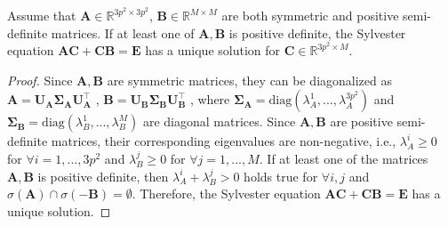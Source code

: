 \begin{theorem}
\label{th2}
Assume that $\bm{A}\in\mathbb{R}^{3p^2\times 3p^2}$, $\bm{B}\in\mathbb{R}^{M\times M}$ are both symmetric and positive semi-definite matrices. If at least one of $\bm{A}, \bm{B}$ is positive definite, the Sylvester equation $\bm{A}\bm{C}
+
\bm{C}\bm{B}
=
\bm{E}$ has a unique solution for $\bm{C}\in \mathbb{R}^{3p^2\times M}$.
\end{theorem}
\vspace{-4mm}
\begin{proof}
Since $\bm{A}, \bm{B}$ are symmetric matrices, they can be diagonalized as 
$
\bm{A}
=
\bm{U}_{\bm{A}}\bm{\Sigma}_{\bm{A}}\bm{U}_{\bm{A}}^{\top}
$
,
$
\bm{B}
=
\bm{U}_{\bm{B}}\bm{\Sigma}_{\bm{B}}\bm{U}_{\bm{B}}^{\top}
$
,
where $\bm{\Sigma}_{\bm{A}}=\text{diag}(\lambda_{A}^{1},...,\lambda_{A}^{3p^2})$ and $\bm{\Sigma}_{\bm{B}}=\text{diag}(\lambda_{B}^{1},...,\lambda_{B}^{M})$ are diagonal matrices. Since $\bm{A}, \bm{B}$ are positive semi-definite matrices, their corresponding eigenvalues are non-negative, i.e., $\lambda_{A}^{i}\ge0$ for $\forall i=1,...,3p^2$ and $\lambda_{B}^{j}\ge0$ for $\forall j=1,...,M$. If at least one of the matrices $\bm{A}, \bm{B}$ is positive definite, then $\lambda_{A}^{i}+\lambda_{B}^{j}>0$ holds true for $\forall i, j$ and $\sigma(\bm{A})\cap\sigma(\bm{-B})=\emptyset$. Therefore, the Sylvester equation $\bm{A}\bm{C}
+
\bm{C}\bm{B}
=
\bm{E}$ has a unique solution.
\end{proof}


